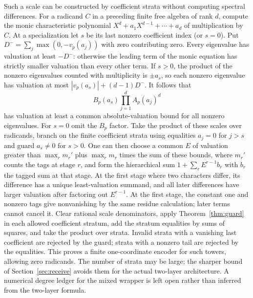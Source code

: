 \documentclass[11pt]{article}
\begin{document}
Such a scale can be constructed by coefficient strata without computing
spectral differences. For a radicand $C$ in a preceding finite free
algebra of rank $d$, compute the monic characteristic polynomial
$X^d+a_1X^{d-1}+\cdots+a_d$ of multiplication by $C$.
At a specialization let $s$ be its last nonzero coefficient index
(or $s=0$). Put $D^- = \sum_j\max(0,-v_p(a_j))$ with zero contributing
zero. Every eigenvalue has valuation at least $-D^-$: otherwise the
leading term of the monic equation has strictly smaller valuation
than every other term. If $s>0$, the product of the nonzero eigenvalues
counted with multiplicity is $\pm a_s$, so each nonzero eigenvalue
has valuation at most $|v_p(a_s)|+(d-1)D^-$. It follows that
\[
 B_p(a_s)\prod_{j=1}^d A_p(a_j)^d
\]
has valuation at least a common absolute-valuation bound for all
nonzero eigenvalues. For $s=0$ omit the $B_p$ factor. Take the product
of these scales over radicands, branch on the finite coefficient strata
using equalities $a_j=0$ for $j>s$ and guard $a_s\ne0$ for $s>0$.
One can then choose a common $E$ of valuation greater than
$\max_r m_r'$ plus $\max_r m_r$ times the sum of these bounds, where
$m_r'$ counts the tags at stage $r$, and form the hierarchical sum
$1+\sum_r E^{r-1} b_r$ with $b_r$ the tagged sum at that stage.
At the first stage where two characters differ, its difference has a
unique least-valuation summand, and all later differences have larger
valuation after factoring out $E^{r-1}$. At the first stage, the constant
one and nonzero tags give nonvanishing by the same residue calculation;
later terms cannot cancel it. Clear rational scale denominators,
apply Theorem~\ref{thm:guard} in each allowed coefficient stratum, add
the stratum equalities by sums of squares, and take the product over
strata. Invalid strata with a vanishing last coefficient are rejected
by the guard; strata with a nonzero tail are rejected by the equalities.
This proves a finite one-coordinate encoder for such towers, allowing
zero radicands. The number of strata may be large; the sharper bound
of Section~\ref{sec:receive} avoids them for the actual two-layer
architecture. A numerical degree ledger for the mixed wrapper is left
open rather than inferred from the two-layer formula.
\end{document}
